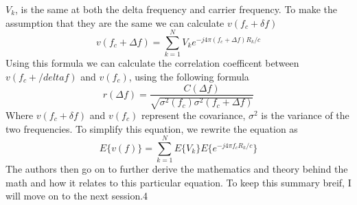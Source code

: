 \documentclass[12pt]{article}
\begin{document}
$V_k$, is the same at both the delta frequency and carrier frequency. To make the assumption that they are the same we can calculate $v(f_c + \delta f)$
\begin{equation}
    v(f_c + \Delta f) = \sum_{k=1}^{N} V_k e^{-j4\pi (f_c + \Delta f) R_k / c}
\end{equation}
Using this formula we can calculate the correlation coefficent between $v(f_c + /delta f)$ and $v(f_c)$, using the following formula
\begin{equation}
   r(\Delta f) = \frac{ C(\Delta f) }{ \sqrt{\sigma^2 (f_c) \sigma^2 (f_c + \Delta f)}}
\end{equation} 
Where $v(f_c + \delta f)$ and $v(f_c)$ represent the covariance, $\sigma^2$ is the variance of the two frequencies. To simplify this equation, we rewrite the equation as 
\begin{equation}
   E\{ v(f) \} = \sum_{k=1}^{N} E \{ V_k\} E \{ e^{-j 4 \pi f_c R_k / c} \}
\end{equation}
The authors then go on to further derive the mathematics and theory behind the math and how it relates to this particular equation. To keep this summary breif, I will move on to the next session.4

\end{document}
